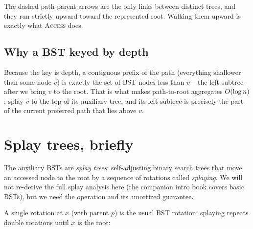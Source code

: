 The dashed path-parent arrows are the only links between distinct trees, and they
run strictly upward toward the represented root. Walking them upward is exactly
what \textsc{Access} does.

\subsection{Why a BST keyed by depth}

Because the key is depth, a contiguous prefix of the path (everything shallower
than some node $v$) is exactly the set of BST nodes less than $v$ -- the left
subtree after we bring $v$ to the root. That is what makes path-to-root
aggregates $O(\log n)$: splay $v$ to the top of its auxiliary tree, and its
left subtree is precisely the part of the current preferred path that lies above
$v$.

\section{Splay trees, briefly}
\label{ch22:splay}

The auxiliary BSTs are \emph{splay trees}: self-adjusting binary search trees
that move an accessed node to the root by a sequence of rotations called
\emph{splaying}. We will not re-derive the full splay analysis here (the
companion intro book covers basic BSTs), but we need the operation and its
amortized guarantee.

A single rotation at $x$ (with parent $p$) is the usual BST rotation; splaying
repeats double rotations until $x$ is the root:

\begin{center}
\end{center}

